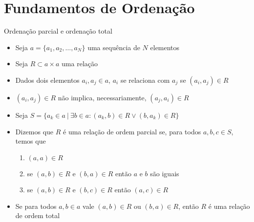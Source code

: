\section{Fundamentos de Ordenação}

\begin{frame}[fragile]{Ordenação parcial e ordenação total}

    \begin{itemize}
        \item Seja $a = \lbrace a_1, a_2, \ldots, a_N\rbrace $ uma sequência de 
        $N$ elementos

        \item Seja $R\subset a\times a$ uma relação 

        \item Dados dois elementos $a_i, a_j\in a$, $a_i$ se relaciona com $a_j$ se 
            $(a_i, a_j)\in R$ 

        \item $(a_i, a_j)\in R$ não implica, necessariamente, $(a_j, a_i)\in R$

        \item Seja $S = \lbrace a_k\in a\ | \ \exists b\in a : (a_k, b)\in R \vee (b, a_k)\in R
            \rbrace$

        \item Dizemos que $R$ é uma relação de ordem parcial se, para todos $a, b, c\in S$, 
            temos que
            \begin{enumerate}
                \item $(a, a)\in R$
                \item se $(a, b)\in R$ e $(b, a)\in R$ então $a$ e $b$ são iguais
                \item se $(a, b)\in R$ e $(b, c)\in R$ então $(a, c)\in R$
            \end{enumerate}

        \item Se para todos $a, b\in a$ vale $(a, b)\in R$ ou $(b, a)\in R$, então $R$ é uma
            relação de ordem total
    \end{itemize}

\end{frame}

